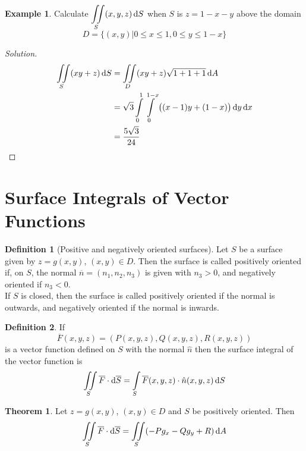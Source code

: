 \documentclass[fleqn, a4paper, 12pt]{article}
\theoremstyle{definition}
\newtheorem{example}{Example}
\newtheorem{definition}{Definition}
\theoremstyle{theorem}
\newtheorem{theorem}{Theorem}
\theoremstyle{remark}
\newenvironment{solution}
{\begin{proof}[Solution]\let\qed\relax}
	{\end{proof}}
\begin{document}
\begin{example}
	Calculate $\displaystyle \iint\limits_{S} (x,y,z) \dif S$ when $S$ is $z = 1 - x - y$ above the domain
	\begin{equation*}
		D = \{(x,y) | 0 \leq x \leq 1, 0 \leq y \leq 1 - x\}
	\end{equation*}
\end{example}

\begin{solution}
	\begin{align*}
		\iint\limits_{S} (xy + z) \dif S &= \iint\limits_{D} (xy + z) \sqrt{1 + 1 + 1} \dif A\\
		&= \sqrt{3} \int\limits_{0}^{1} \int\limits_{0}^{1 - x} \left( (x - 1) y + (1 - x) \right) \dif y \dif x\\
		&= \dfrac{5 \sqrt{3}}{24}
	\end{align*}
\end{solution}

\section{Surface Integrals of Vector Functions}

\begin{definition}[Positive and negatively oriented surfaces]
	Let $S$ be a surface given by $z = g(x,y)$, $(x,y) \in D$. Then the surface is called positively oriented if, on $S$, the normal $\overline{n} = (n_1, n_2, n_3)$ is given with $n_3 > 0$, and negatively oriented if $n_3 < 0$.\\
	If $S$ is closed, then the surface is called positively oriented if the normal is outwards, and negatively oriented if the normal is inwards.
\end{definition}

\begin{definition}
	If 
	\begin{equation*}
		\overline{F}(x,y,z) = \left( P(x,y,z), Q(x,y,z), R(x,y,z) \right)
	\end{equation*}
	is a vector function defined on $S$ with the normal $\hat{n}$ then the surface integral of the vector function is
	\begin{equation*}
		\iint\limits_{S} \overline{F} \cdot \dif \overline{S} = \int\limits_{S} \overline{F}(x,y,z) \cdot \hat{n}(x,y,z) \dif S
	\end{equation*}
\end{definition}

\begin{theorem}
	Let $z = g(x,y)$, $(x,y) \in D$ and $S$ be positively oriented. Then
	\begin{equation*}
		\iint\limits_{S} \overline{F} \cdot \dif \overline{S} = \iint\limits_{S} (-P g_x - Q g_y + R) \dif A
	\end{equation*}
\end{theorem}
\end{document}
